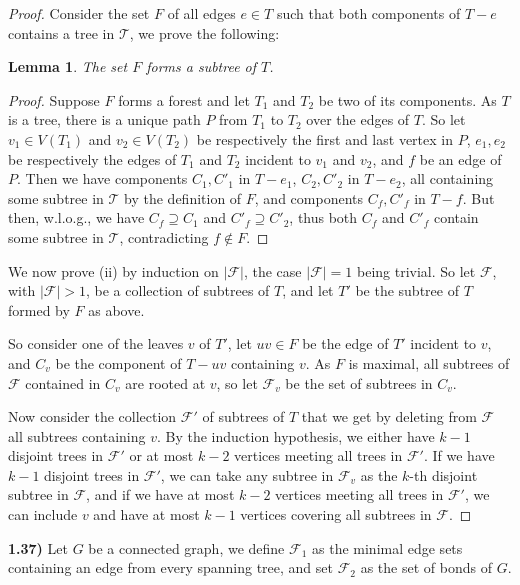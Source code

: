 \documentclass[11pt]{article}
\theoremstyle{plain}
\newtheorem{lemma}{Lemma}
\begin{document}
\begin{proof}
Consider the set $F$ of all edges $e \in T$ such that both components of $T-e$ contains a tree in $\mathcal{T}$, we prove the following:

\begin{lemma}
The set $F$ forms a subtree of $T$. 
\end{lemma}

\begin{proof}
Suppose $F$ forms a forest and let $T_1$ and $T_2$ be two of its components. As $T$ is a tree, there is a unique path $P$ from $T_1$ to $T_2$ over the edges of $T$. So let $v_1 \in V(T_1)$ and $v_2 \in V(T_2)$ be respectively the first and last vertex in $P$, $e_1, e_2$ be respectively the edges of $T_1$ and $T_2$ incident to $v_1$ and $v_2$, and $f$ be an edge of $P$. Then we have components $C_1,C'_1$ in $T-e_1$, $C_2,C'_2$ in $T-e_2$, all containing some subtree in $\mathcal{T}$ by the definition of $F$, and components $C_f, C'_f$ in $T-f$. But then, w.l.o.g., we have $C_f \supseteq C_1$ and $C'_f \supseteq C'_2$, thus both $C_f$ and $C'_f$ contain some subtree in $\mathcal{T}$, contradicting $f \not \in F$.
\end{proof}

We now prove (ii) by induction on $|\mathcal{F}|$, the case $|\mathcal{F}| = 1$ being trivial. 
So let $\mathcal{F}$, with $|\mathcal{F}| > 1$, be a collection of subtrees of $T$, and let $T'$ be the subtree of $T$ formed by $F$ as above. 

So consider one of the leaves $v$ of $T'$, let $uv \in F$ be the edge of $T'$ incident to $v$, and $C_v$ be the component of $T-uv$ containing $v$.
As $F$ is maximal, all subtrees of $\mathcal{F}$ contained in $C_v$ are rooted at $v$, so let $\mathcal{F}_v$ be the set of subtrees in $C_v$.

Now consider the collection $\mathcal{F}'$ of subtrees of $T$ that we get by deleting from $\mathcal{F}$ all subtrees containing $v$. 
By the induction hypothesis, we either have $k-1$ disjoint trees in $\mathcal{F}'$ or at most $k-2$ vertices meeting all trees in $\mathcal{F}'$.
If we have $k-1$ disjoint trees in $\mathcal{F}'$, we can take any subtree in $\mathcal{F}_v$ as the $k$-th disjoint subtree in $\mathcal{F}$, and if we have at most $k-2$ vertices meeting all trees in $\mathcal{F}'$, we can include $v$ and have at most $k-1$ vertices covering all subtrees in $\mathcal{F}$.
\end{proof}

\textbf{1.37)} Let $G$ be a connected graph, we define $\mathcal{F}_1$ as the minimal edge sets containing an edge from every spanning tree, and set $\mathcal{F}_2$ as the set of bonds of $G$.
\end{document}
